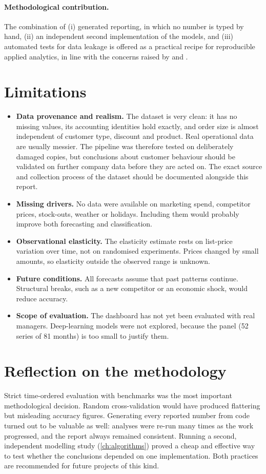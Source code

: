 \paragraph{Methodological contribution.} The combination of (i) generated reporting, in which no number is typed
by hand, (ii) an independent second implementation of the models, and (iii) automated tests for data leakage
is offered as a practical recipe for reproducible applied analytics, in line with the concerns raised by
\citet{sculley2015} and \citet{kaufman2012}.

\section{Limitations}\label{sec:limitations}
\begin{itemize}
  \item \textbf{Data provenance and realism.} The dataset is very clean: it has no missing values, its
        accounting identities hold exactly, and order size is almost independent of customer type, discount and
        product. Real operational data are usually messier. The pipeline was therefore tested on deliberately
        damaged copies, but conclusions about customer behaviour should be validated on further company data
        before they are acted on. The exact source and collection process of the dataset should be documented
        alongside this report.
  \item \textbf{Missing drivers.} No data were available on marketing spend, competitor prices, stock-outs,
        weather or holidays. Including them would probably improve both forecasting and classification.
  \item \textbf{Observational elasticity.} The elasticity estimate rests on list-price variation over time, not
        on randomised experiments. Prices changed by small amounts, so elasticity outside the observed range is
        unknown.
  \item \textbf{Future conditions.} All forecasts assume that past patterns continue. Structural breaks, such as
        a new competitor or an economic shock, would reduce accuracy.
  \item \textbf{Scope of evaluation.} The dashboard has not yet been evaluated with real managers. Deep-learning
        models were not explored, because the panel (52 series of 81 months) is too small to justify them.
\end{itemize}

\section{Reflection on the methodology}
Strict time-ordered evaluation with benchmarks was the most important methodological decision. Random
cross-validation would have produced flattering but misleading accuracy figures. Generating every reported
number from code turned out to be valuable as well: analyses were re-run many times as the work progressed, and
the report always remained consistent. Running a second, independent modelling study (\cref{ch:algorithms})
proved a cheap and effective way to test whether the conclusions depended on one implementation. Both practices
are recommended for future projects of this kind.
